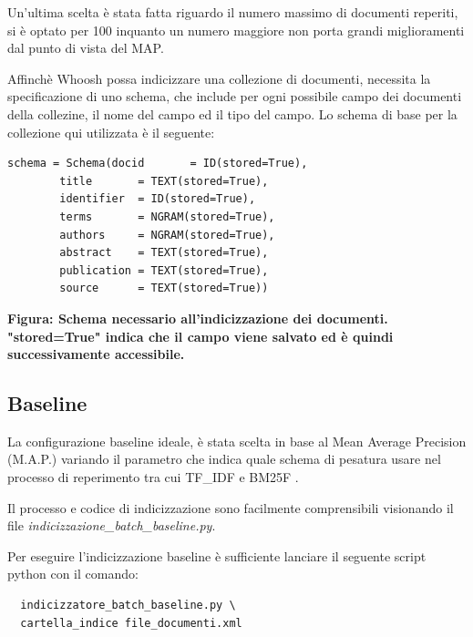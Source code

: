 \documentclass[runningheads]{llncs}
\begin{document}
Un'ultima scelta \`e stata fatta riguardo il numero massimo di documenti reperiti, si \`e optato per 100 inquanto un numero maggiore non porta grandi miglioramenti dal punto di vista del MAP. \par







Affinch\`e Whoosh possa indicizzare una collezione di documenti, necessita la
specificazione di uno schema, che include per ogni possibile campo dei documenti della collezine, il nome del campo ed il tipo del campo. 
Lo schema di base per la collezione qui utilizzata \`e il seguente:
\par

\begin{lstlisting}
schema = Schema(docid      	= ID(stored=True),
		title      	= TEXT(stored=True),
		identifier	= ID(stored=True),
		terms 		= NGRAM(stored=True),
		authors		= NGRAM(stored=True),
		abstract 	= TEXT(stored=True),
		publication	= TEXT(stored=True),
		source 		= TEXT(stored=True))
\end{lstlisting}
\begin{tablenotes}
      \small
      \item \bf Figura: Schema necessario all'indicizzazione dei documenti. "stored=True" indica che il campo viene salvato ed \`e quindi successivamente accessibile.
    \end{tablenotes}
\par


\subsection{Baseline}
La configurazione baseline ideale, \`e stata scelta in base al Mean Average Precision (M.A.P.)\cite{WBC_map} variando il parametro che indica quale schema di 
pesatura usare nel processo di reperimento tra cui TF\_IDF e BM25F .

 Il processo e codice di indicizzazione sono  facilmente comprensibili visionando il file  \emph{indicizzazione\_batch\_baseline.py}. \par
\lstset{
  language=bash,
  basicstyle=\ttfamily
}

Per eseguire l'indicizzazione  baseline \`e sufficiente lanciare il seguente script python con il comando:
\begin{lstlisting}
  indicizzatore_batch_baseline.py \ 
  cartella_indice file_documenti.xml
\end{lstlisting}
\end{document}
